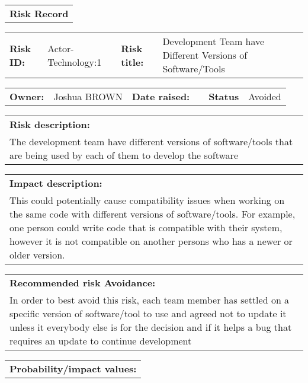 \begin{table}
	\begin{tabularx}{\textwidth}{| X |}
		\hline
		\textbf{Risk Record} \\
	\end{tabularx}
	\begin{tabularx}{\textwidth}{| l | X | l | X |}
		\hline
		\textbf{Risk ID:} & Actor-Technology:1 & \textbf{Risk title:} & Development Team have Different Versions of Software/Tools  \\
	\end{tabularx}
	\begin{tabularx}{\textwidth}{| l | X | l | X | l | X |}
		\hline
		\textbf{Owner:} & Joshua BROWN & \textbf{Date raised:} &  & \textbf{Status} & Avoided \\
	\end{tabularx}
	\begin{tabularx}{\textwidth}{| X |}
		\hline
		\textbf{Risk description:} \\ The development team have different versions of software/tools that are being used by each of them to develop the software \\
	\end{tabularx}
	\begin{tabularx}{\textwidth}{| X |}
		\hline
		\textbf{Impact description:} \\ This could potentially cause compatibility issues when working on the same code with different versions of software/tools. For example, one person could write code that is compatible with their system, however it is not compatible on another persons who has a newer or older version. \\
	\end{tabularx}
	\begin{tabularx}{\textwidth}{| X |}
		\hline
		\textbf{Recommended risk Avoidance:} \\ In order to best avoid this risk, each team member has settled on a specific version of software/tool to use and agreed not to update it unless it everybody else is for the decision and if it helps a bug that requires an update to continue development \\
	\end{tabularx}
	\begin{tabularx}{\textwidth}{| X |}
		\hline
		\textbf{Probability/impact values:} \\
	\end{tabularx}
	\begin{tabularx}{\textwidth}{| l | l | X | X | X |}

\end{tabularx}
\end{table}

